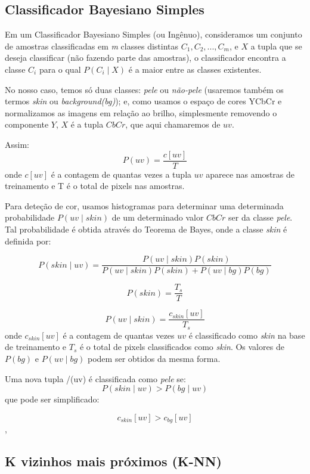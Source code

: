 \documentclass[conference]{IEEEtran}
\begin{document}
\subsection{Classificador Bayesiano Simples}
Em um Classificador Bayesiano Simples (ou Ingênuo), consideramos um conjunto de amostras classificadas em \textit{m} classes distintas \(C_1, C_2,...,C_m\), e \(X\) a tupla que se deseja classificar (não fazendo parte das amostras), o classificador encontra a classe \(C_i\) para o qual \(P(C_i \mid X)\) é a maior entre as classes existentes.

No nosso caso, temos só duas classes: \textit{pele} ou \textit{não-pele} (usaremos também os termos \textit{skin} ou \textit{background(bg)}); e, como usamos o espaço de cores YCbCr e normalizamos as imagens em relação ao brilho, simplesmente removendo o componente \(Y\), \(X\) é a tupla \(CbCr\), que aqui chamaremos de \(uv\).

Assim:
\begin{equation}
P(uv) = \frac{c[uv]}{T}
\end{equation}
onde \(c[uv]\) é a contagem de quantas vezes a tupla \(uv\) aparece nas amostras de treinamento e T é o total de pixels nas amostras. 

Para deteção de cor, usamos histogramas para determinar uma determinada probabilidade \(P(uv \mid skin)\) de um determinado valor \(CbCr\) ser da classe \textit{pele}. Tal probabilidade é obtida através do Teorema de Bayes\cite{teo}, onde a classe \textit{skin} é definida por:

$$ P(skin \mid uv) = \frac{P(uv \mid skin)P(skin)}{P(uv \mid skin) P(skin) + P(uv \mid bg) P(bg)} $$


$$P(skin) = \frac{T_s}{T}$$

\begin{equation}
P(uv \mid skin) = \frac{c_{skin}[uv]}{T_s}
\end{equation}
onde \(c_{skin}[uv]\) é a contagem de quantas vezes \(uv\) é classificado como \textit{skin} na base de treinamento e \(T_s\) é o total de pixels classificados como \textit{skin}. Os valores de \(P(bg)\) e \(P(uv \mid bg)\) podem ser obtidos da mesma forma.

Uma nova tupla /(uv) é classificada como \textit{pele} se:
$$P (skin \mid uv) > P (bg \mid uv)$$
que pode ser simplificado\cite{teo}:

$$c_{skin}[uv] > c_{bg}[uv]$$,


\subsection{K vizinhos mais próximos (K-NN)}
\end{document}
